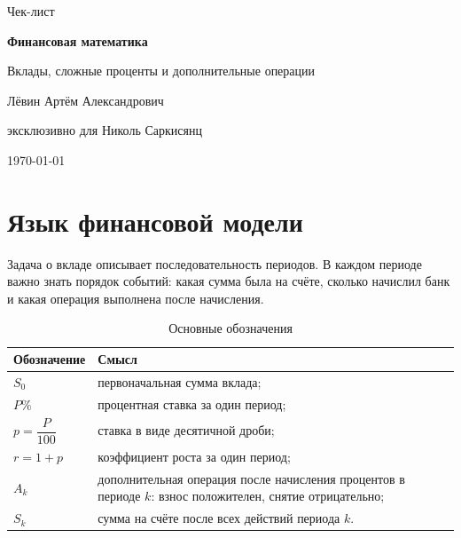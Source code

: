 \documentclass[a4paper,12pt]{article}
\begin{document}
\begin{titlepage}
  \thispagestyle{empty}
  \centering
  \vspace*{26mm}
  {\Large\textcolor{accent}{Чек-лист}\par}
  \vspace{7mm}
  {\Huge\bfseries\textcolor{darkaccent}{Финансовая математика}\par}
  \vspace{3mm}
  {\LARGE Вклады, сложные проценты и дополнительные операции\par}
  \vfill
  {\large Лёвин Артём Александрович\par}
  {\large эксклюзивно для Николь Саркисянц\par}
  \vspace{8mm}
  {\large \today\par}
  \vfill
  \vspace*{8mm}
\end{titlepage}

\tableofcontents
\clearpage

\section{Язык финансовой модели}

Задача о вкладе описывает последовательность периодов. В каждом периоде важно знать порядок событий: какая сумма была на счёте, сколько начислил банк и какая операция выполнена после начисления.

\begin{table}[ht]
\centering
\caption{Основные обозначения}
\begin{tabularx}{\linewidth}{@{}>{\bfseries}lX@{}}
\toprule
Обозначение & Смысл \\
\midrule
$S_0$ & первоначальная сумма вклада; \\
$P\%$ & процентная ставка за один период; \\
$p=\dfrac{P}{100}$ & ставка в виде десятичной дроби; \\
$r=1+p$ & коэффициент роста за один период; \\
$A_k$ & дополнительная операция после начисления процентов в периоде $k$: взнос положителен, снятие отрицательно; \\
$S_k$ & сумма на счёте после всех действий периода $k$. \\
\bottomrule
\end{tabularx}
\end{table}
\end{document}
